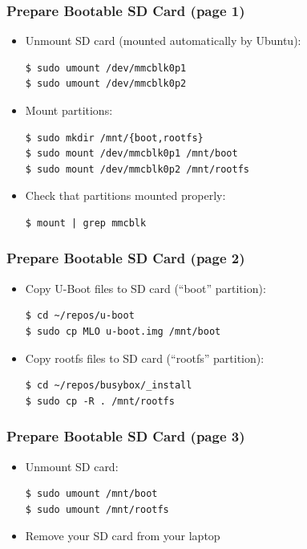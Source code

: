 \begin{frame}[fragile]
  \frametitle{Prepare Bootable SD Card (page 1)}
  \begin{itemize}
    \item Unmount SD card (mounted automatically by Ubuntu):
      \begin{verbatim}
$ sudo umount /dev/mmcblk0p1
$ sudo umount /dev/mmcblk0p2
      \end{verbatim}
    \item Mount partitions:
      \begin{verbatim}
$ sudo mkdir /mnt/{boot,rootfs}
$ sudo mount /dev/mmcblk0p1 /mnt/boot
$ sudo mount /dev/mmcblk0p2 /mnt/rootfs
      \end{verbatim}
    \item Check that partitions mounted properly:
      \begin{verbatim}
$ mount | grep mmcblk
      \end{verbatim}
  \end{itemize}
  \vspace*{-5mm} %
\end{frame}

\begin{frame}[fragile]
  \frametitle{Prepare Bootable SD Card (page 2)}
  \begin{itemize}
    \item Copy U-Boot files to SD card (``boot'' partition):
      \begin{verbatim}
$ cd ~/repos/u-boot
$ sudo cp MLO u-boot.img /mnt/boot
      \end{verbatim}
    \item Copy rootfs files to SD card (``rootfs'' partition):
      \begin{verbatim}
$ cd ~/repos/busybox/_install
$ sudo cp -R . /mnt/rootfs
      \end{verbatim}
  \end{itemize}
\end{frame}

\begin{frame}[fragile]
  \frametitle{Prepare Bootable SD Card (page 3)}
  \begin{itemize}
    \item Unmount SD card:
      \begin{verbatim}
$ sudo umount /mnt/boot
$ sudo umount /mnt/rootfs
      \end{verbatim}
    \item Remove your SD card from your laptop
  \end{itemize}
\end{frame}

